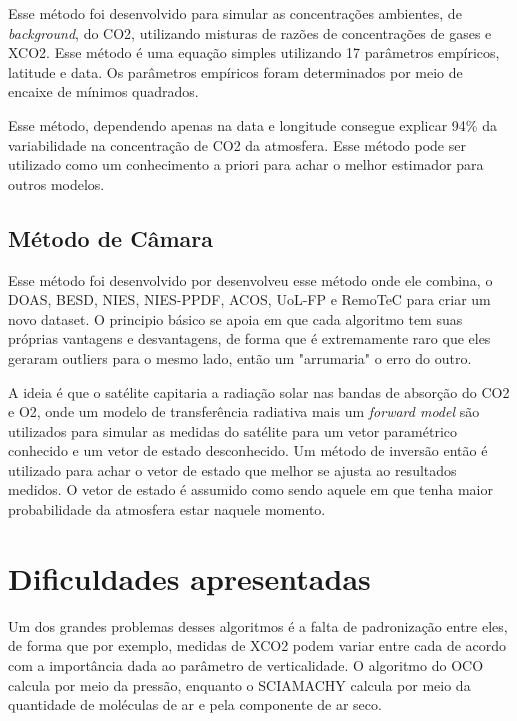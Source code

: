\documentclass{article}[12pt]
\begin{document}
Esse método foi desenvolvido para simular as concentrações ambientes, de \textit{background}, do
CO2, utilizando misturas de razões de concentrações de gases e XCO2. Esse método é uma equação
simples utilizando 17 parâmetros empíricos, latitude e data. Os parâmetros empíricos foram
determinados por meio de encaixe de mínimos quadrados. \par

Esse método, dependendo apenas na data e longitude consegue explicar 94\% da variabilidade na
concentração de CO2 da atmosfera. Esse método pode ser utilizado como um conhecimento a priori para
achar o melhor estimador para outros modelos. \par

\subsection{Método de Câmara}

Esse método foi desenvolvido por  desenvolveu esse método onde ele combina, o
DOAS, BESD, NIES, NIES-PPDF, ACOS, UoL-FP e RemoTeC para criar um novo dataset. O principio básico
se apoia em que cada algoritmo tem suas próprias vantagens e desvantagens, de forma que é
extremamente raro que eles geraram outliers para o mesmo lado, então um "arrumaria" o erro do outro.
\par

A ideia é que o satélite capitaria a radiação solar nas bandas de absorção do CO2 e O2, onde um
modelo de transferência radiativa mais um \textit{forward model} são utilizados para simular as
medidas do satélite para um vetor paramétrico conhecido e um vetor de estado desconhecido. Um método
de inversão então é utilizado para achar o vetor de estado que melhor se ajusta ao resultados
medidos. O vetor de estado é assumido como sendo aquele em que tenha maior probabilidade da
atmosfera estar naquele momento. \par

\section{Dificuldades apresentadas}

Um dos grandes problemas desses algoritmos é a falta de padronização entre eles, de forma que por
exemplo, medidas de XCO2 podem variar entre cada de acordo com a importância dada ao parâmetro de
verticalidade. O algoritmo do OCO calcula por meio da pressão, enquanto o SCIAMACHY calcula
por meio da quantidade de moléculas de ar e pela componente de ar seco. \par
\end{document}
